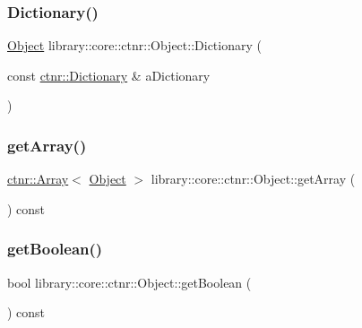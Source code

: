 \subsubsection{\texorpdfstring{Dictionary()}{Dictionary()}}
{\footnotesize\ttfamily \hyperlink{classlibrary_1_1core_1_1ctnr_1_1_object}{Object} library\+::core\+::ctnr\+::\+Object\+::\+Dictionary (\begin{DoxyParamCaption}\item[{const \hyperlink{classlibrary_1_1core_1_1ctnr_1_1_dictionary}{ctnr\+::\+Dictionary} \&}]{a\+Dictionary }\end{DoxyParamCaption})\hspace{0.3cm}{\ttfamily [static]}}

\mbox{\label{classlibrary_1_1core_1_1ctnr_1_1_object_af72b48798c45695b7b225a961c57d8d0}} 
\subsubsection{\texorpdfstring{get\+Array()}{getArray()}}
{\footnotesize\ttfamily \hyperlink{classlibrary_1_1core_1_1ctnr_1_1_array}{ctnr\+::\+Array}$<$ \hyperlink{classlibrary_1_1core_1_1ctnr_1_1_object}{Object} $>$ library\+::core\+::ctnr\+::\+Object\+::get\+Array (\begin{DoxyParamCaption}{ }\end{DoxyParamCaption}) const}

\mbox{\label{classlibrary_1_1core_1_1ctnr_1_1_object_a57a984b26f914c33155c79f88e01b934}} 
\subsubsection{\texorpdfstring{get\+Boolean()}{getBoolean()}}
{\footnotesize\ttfamily bool library\+::core\+::ctnr\+::\+Object\+::get\+Boolean (\begin{DoxyParamCaption}{ }\end{DoxyParamCaption}) const}

